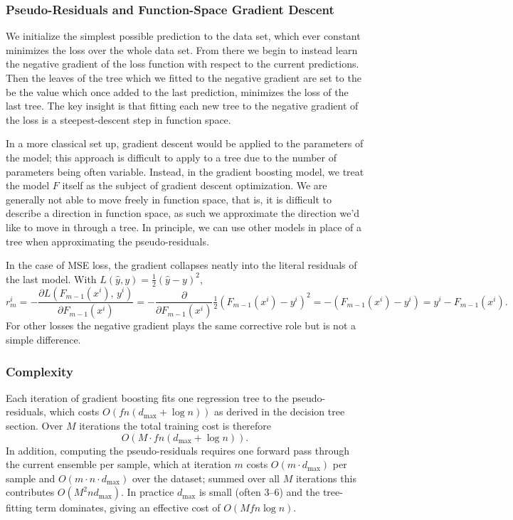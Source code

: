 \documentclass[a4paper, 11pt]{article}
\begin{document}
\subsubsection{Pseudo-Residuals and Function-Space Gradient Descent}

We initialize the simplest possible prediction to the data set, which
ever constant minimizes the loss over the whole data set. From there
we begin to instead learn the negative gradient of the loss function
with respect to the current predictions. Then the leaves of the tree
which we fitted to the negative gradient are set to the be the value
which once added to the last prediction, minimizes the loss of the last tree.
The key insight is that fitting each new tree to the negative gradient
of the loss is a steepest-descent step in function space.

In a more classical set up, gradient descent would be applied to the
parameters of the model; this approach is difficult to apply to a
tree due to the number of parameters being often variable. Instead,
in the gradient boosting model, we treat the model $F$ itself as the
subject of gradient descent optimization. We are generally not able
to move freely in function space, that is, it is difficult to
describe a direction in function space, as such we approximate the
direction we'd like to move in through a tree. In principle, we can
use other models in place of a tree when approximating the pseudo-residuals.

In the case of MSE loss, the gradient collapses neatly into the
literal residuals of the last model. With
$L(\hat{y}, y) = \tfrac{1}{2}(\hat{y} - y)^2$,
\[
  r^i_m
  = -\frac{\partial L(F_{m-1}(x^i),\, y^i)}{\partial F_{m-1}(x^i)}
  = -\frac{\partial}{\partial F_{m-1}(x^i)}
  \tfrac{1}{2}\!\left(F_{m-1}(x^i) - y^i\right)^2
  = -\!\left(F_{m-1}(x^i) - y^i\right)
  = y^i - F_{m-1}(x^i).
\]
For other losses the negative
gradient plays the same corrective role but is not a simple
difference.

\subsubsection{Complexity}

Each iteration of gradient boosting fits one regression tree to the
pseudo-residuals, which costs $O\!\left(fn(d_{\max} + \log n)\right)$
as derived in the decision tree section. Over $M$ iterations the
total training cost is therefore
\[
  O\!\left(M \cdot fn(d_{\max} + \log n)\right).
\]
In addition, computing the pseudo-residuals requires one forward pass
through the current ensemble per sample, which at iteration $m$ costs
$O(m \cdot d_{\max})$ per sample and $O(m \cdot n \cdot d_{\max})$
over the dataset; summed over all $M$ iterations this contributes
$O(M^2 n d_{\max})$. In practice $d_{\max}$ is small (often 3--6)
and the tree-fitting term dominates, giving an effective cost of
$O(Mfn \log n)$.
\end{document}
